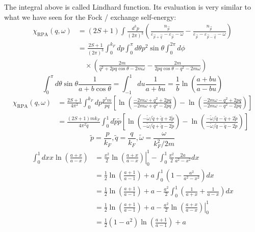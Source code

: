 The integral above is called Lindhard function. Its evaluation is very similar to what we have seen for the Fock / exchange self-energy:
\begin{align*}
    \chi _{\mathrm{RPA}}\left( q,\omega \right) &=\left( 2S+1 \right) \int{\frac{d^3p}{\left( 2\pi \right) ^3}\left( \frac{n_{\vec{p}}}{\varepsilon _{\vec{p}+\vec{q}}-\varepsilon _{\vec{p}}-\omega}-\frac{n_{\vec{p}}}{\varepsilon _{\vec{p}}-\varepsilon _{\vec{p}-\vec{q}}-\omega} \right)}\\
    &=\frac{2S+1}{\left( 2\pi \right) ^3}\int_0^{k_F}{dp\int_0^{\pi}{d\theta p^2\sin \theta \int_0^{2\pi}{d\phi}}}\\
    &\quad \times \left( \frac{2m}{q^2+2pq\cos \theta -2m\omega}-\frac{2m}{2pq\cos \theta -q^2-2m\omega} \right)
\end{align*}
\[ \int_0^{\pi}{d\theta \sin \theta \frac{1}{a+b\cos \theta}}=\int_{-1}^1{du\frac{1}{a+bu}}=\frac{1}{b}\ln \left( \frac{a+bu}{a-bu} \right) \]
\begin{align*}
    \chi _{\mathrm{RPA}}\left( q,\omega \right) &=\frac{2S+1}{4\pi ^2}\int_0^{k_F}{dp\frac{p^2m}{pq}\left[ \ln \left( \frac{-2m\omega +q^2+2pq}{-2m\omega +q^2-2pq} \right) -\ln \left( \frac{-2m\omega -q^2+2pq}{-2m\omega -q^2-2pq} \right) \right]}\\
    &=\frac{\left( 2S+1 \right) mk_F}{4\pi ^2\tilde{q}}\int_0^1{d\tilde{p}\tilde{p}\left[ \ln \left( \frac{-\tilde{\omega}/\tilde{q}+\tilde{q}+2\tilde{p}}{-\tilde{\omega}/\tilde{q}+\tilde{q}-2\tilde{p}} \right) -\ln \left( \frac{-\tilde{\omega}/\tilde{q}-\tilde{q}+2\tilde{p}}{-\tilde{\omega}/\tilde{q}-\tilde{q}-2\tilde{p}} \right) \right]}
\end{align*}
\[ \tilde{p}=\frac{p}{k_F},\tilde{q}=\frac{q}{k_F},\tilde{\omega}=\frac{\omega}{k_{F}^{2}/2m}\]
\begin{align*}
    \int_0^1{dxx\ln \left( \frac{a+x}{a-x} \right)}&=\left. \frac{x^2}{2}\ln \left( \frac{a+x}{a-x} \right) \right|_{0}^{1}-\int_0^1{\frac{x^2}{2}\frac{2a}{a^2-x^2}dx}\\
    &=\frac{1}{2}\ln \left( \frac{a+1}{a-1} \right) +a\int_0^1{\left( 1-\frac{a^2}{a^2-x^2} \right) dx}\\
    &=\frac{1}{2}\ln \left( \frac{a+1}{a-1} \right) +a-\frac{a^2}{2}\int_0^1{\left( \frac{1}{a+x}+\frac{1}{a-x} \right) dx}\\
    &=\frac{1}{2}\ln \left( \frac{a+1}{a-1} \right) +a-\frac{a^2}{2}\left. \ln \left( \frac{a+x}{a-x} \right) \right|_{0}^{1}\\
    &=\frac{1}{2}\left( 1-a^2 \right) \ln \left( \frac{a+1}{a-1} \right) +a
\end{align*}
